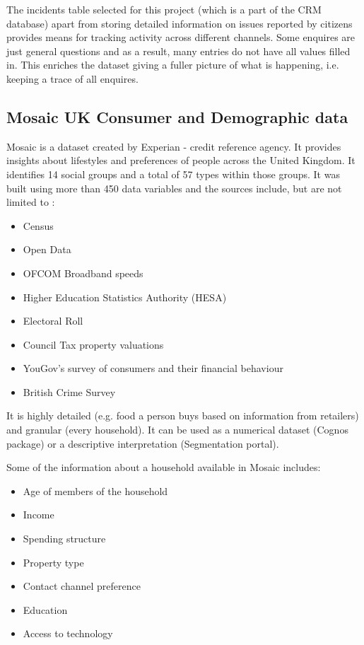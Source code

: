 The incidents table selected for this project (which is a part of the CRM database) apart from storing detailed information on issues reported by citizens provides means for tracking activity across different channels. Some enquires are just general questions and as a result, many entries do not have all values filled in. This enriches the dataset giving a fuller picture of what is happening, i.e. keeping a trace of all enquires.		
		
		\subsection{Mosaic UK Consumer and Demographic data}
		
Mosaic is a dataset created by Experian - credit reference agency. It provides insights about lifestyles and preferences of people across the United Kingdom. It identifies 14 social groups and a total of 57 types within those groups. It was built using more than 450 data variables and the sources include, but are not limited to \citep{Experian2014}:	

\begin{itemize}
\item Census
\item Open Data
\item OFCOM Broadband speeds
\item Higher Education Statistics Authority (HESA)
\item Electoral Roll
\item Council Tax property valuations
\item YouGov's survey of consumers and their financial behaviour
\item British Crime Survey
\end{itemize}

It is highly detailed (e.g. food a person buys based on information from retailers) and granular (every household). It can be used as a numerical dataset (Cognos package) or a descriptive interpretation (Segmentation portal).

Some of the information about a household available in Mosaic includes:

\begin{itemize}
\item Age of members of the household
\item Income
\item Spending structure
\item Property type
\item Contact channel preference
\item Education
\item Access to technology
\end{itemize}
	
